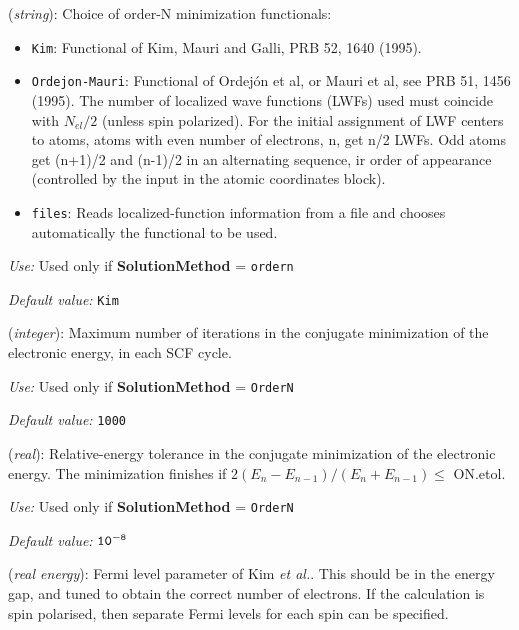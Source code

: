 \documentclass[11pt]{article}
\begin{document}
\begin{description}
\itemsep 10pt
\parsep 0pt
\item[{\bf ON.functional}] ({\it string}):
Choice of order-N minimization functionals:
\begin{itemize}
\item {\tt Kim}:
Functional of Kim, Mauri and Galli, PRB 52, 1640 (1995).
\item {\tt Ordejon-Mauri}:
Functional of Ordej\'on et al, or Mauri et al, see PRB 51, 1456 (1995).
The number of localized wave functions (LWFs) used must coincide with
$N_{el}/2$ (unless spin polarized).
For the initial assignment of LWF centers to atoms, atoms
with even number of electrons, n, get n/2 LWFs. Odd atoms
get (n+1)/2 and (n-1)/2 in an alternating sequence, ir order
of appearance (controlled by the input in the atomic coordinates block).

\item {\tt files}:
Reads localized-function information from a file and
chooses automatically the functional to be used.
\end{itemize}

{\it Use:} Used only if {\bf SolutionMethod} = {\tt ordern}

{\it Default value:} {\tt Kim}

\item[{\bf ON.MaxNumIter}] ({\it integer}):
Maximum number of iterations
in the conjugate minimization of the electronic
energy, in each SCF cycle.

{\it Use:} Used only if {\bf SolutionMethod} = {\tt OrderN}

{\it Default value:} {\tt 1000}

\item[{\bf ON.etol}] ({\it real}):
Relative-energy tolerance in the conjugate minimization of the electronic
energy. The minimization finishes if
\hspace{0.2truecm} $2 (E_n - E_{n-1}) / (E_n + E_{n-1}) \leq $ ON.etol.

{\it Use:} Used only if {\bf SolutionMethod} = {\tt OrderN}

{\it Default value:} ${\tt 10^{-8}}$

\item[{\bf ON.eta}] ({\it real energy}):
Fermi level parameter of Kim
{\it et al.}. This should be in the energy gap, and tuned to obtain
the correct number of electrons. If the calculation is spin polarised,
then separate Fermi levels for each spin can be specified.


\end{description}
\end{document}
